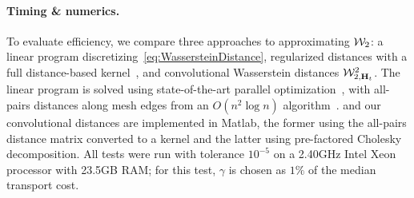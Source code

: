 %
%

\paragraph*{Timing \& numerics.}  To evaluate efficiency, we compare three approaches to approximating $\mathcal W_2$:  a linear program discretizing~\eqref{eq:WassersteinDistance}, regularized distances with a full distance-based kernel~\cite{cuturi-2013}, and convolutional Wasserstein distances $\mathcal W^2_{2,\mathbf{H}_t}$.  The linear program is solved using state-of-the-art parallel optimization~\cite{mosek}, with all-pairs distances along mesh edges from an $O(n^2\log n)$ algorithm~\cite{johnson-1977}.  \cite{cuturi-2013} and our convolutional distances are implemented in Matlab, the former using the all-pairs distance matrix converted to a kernel and the latter using pre-factored Cholesky decomposition.  All tests were run with tolerance $10^{-5}$ on a 2.40GHz Intel Xeon processor with 23.5GB RAM; for this test, $\gamma$ is chosen as $1\%$ of the median transport cost.

